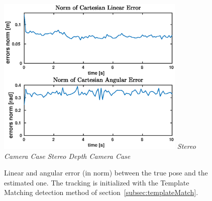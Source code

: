 \begin{figure}
{		\includegraphics[width=9cm]{tracking/templ-depth.eps}
	}
	\hspace*{20px}\textit{Stereo Camera Case} \hspace{135px} \textit{Stereo Depth Camera Case}\\
	\vspace{30px}
	\caption[Tracking error plots with template matching detection initialization]{Linear and angular error (in norm) between the true pose and the estimated one. The tracking is initialized with the Template Matching detection method of \mbox{section \ref{subsec:templateMatch}}.}
	\label{fig:templateErrors}
\end{figure}
